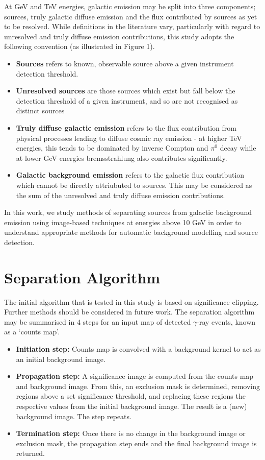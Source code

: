 \documentclass{PoS}
\begin{document}
At GeV and TeV energies, galactic emission may be split into three components; sources, truly galactic diffuse emission and the flux contributed by sources as yet to be resolved. While definitions in the literature vary, particularly with regard to unresolved and truly diffuse emission contributions, this study adopts the following convention (as illustrated in Figure 1).
\begin{itemize}
\item{\textbf{Sources} refers to known, observable source above a given instrument detection threshold.}
\item{\textbf{Unresolved sources} are those sources which exist but fall below the detection threshold of a given instrument, and so are not recognised as distinct sources}
\item{\textbf{Truly diffuse galactic emission} refers to the flux contribution from physical processes leading to diffuse cosmic ray emission - at higher TeV energies, this tends to be dominated by inverse Compton and $\pi^0$ decay while at lower GeV energies bremsstrahlung also contributes significantly.}
\item{\textbf{Galactic background emission} refers to the galactic flux contribution which cannot be directly attriubuted to sources. This may be considered as the sum of the unresolved and truly diffuse emission contributions.}
\end{itemize}

In this work, we study methods of separating sources from galactic background emission using image-based techniques at energies above 10 GeV in order to understand appropriate methods for automatic background modelling and source detection.

\section{Separation Algorithm}


The initial algorithm that is tested in this study is based on significance clipping. Further methods should be considered in future work. The separation algorithm may be summarised in 4 steps for an input map of detected $\gamma$-ray events, known as a `counts map'.

\begin{itemize}
\item{\textbf{Initiation step:} Counts map is convolved with a background kernel to act as an initial background image.}
\item{\textbf{Propagation step:} A significance image is computed from the counts map and background image. From this, an exclusion mask is determined, removing regions above a set significance threshold, and replacing these regions the respective values from the initial background image. The result is a (new) background image. The step repeats.}
\item{\textbf{Termination step:} Once there is no change in the background image or exclusion mask, the propagation step ends and the final background image is returned.}
\end{itemize}
\end{document}
